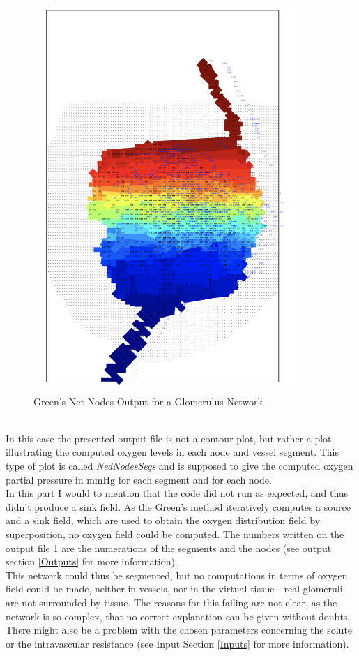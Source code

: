 \begin{figure}[h]
\centering
\includegraphics[width=100mm]{NetNodesSegs_Glom}
\caption{\footnotesize Green's Net Nodes Output for a Glomerulus Network}
\label{fig:NetNodesSegs_Glom}
\end{figure}
\\In this case the presented output file is not a contour plot, but rather a plot illustrating the computed oxygen levels in each node and vessel segment. This type of plot is called \emph{NedNodesSegs} and is supposed to give the computed oxygen partial pressure in mmHg for each segment and for each node.
\\In this part I would to mention that the code did not run as expected, and thus didn't produce a sink field. As the Green's method iteratively computes a source and a sink field, which are used to obtain the oxygen distribution field by superposition, no oxygen field could be computed. The numbers written on the output file \ref{fig:NetNodesSegs_Glom} are the numerations of the segments and the nodes (see output section \ref{Outputs} for more information).
\\This network could thus be segmented, but no computations in terms of oxygen field could be made, neither in vessels, nor in the virtual tissue - real glomeruli are not surrounded by tissue. The reasons for this failing are not clear, as the network is so complex, that no correct explanation can be given without doubts. There might also be a problem with the chosen parameters concerning the solute or the intravascular resistance (see Input Section \ref{Inputs} for more information).

